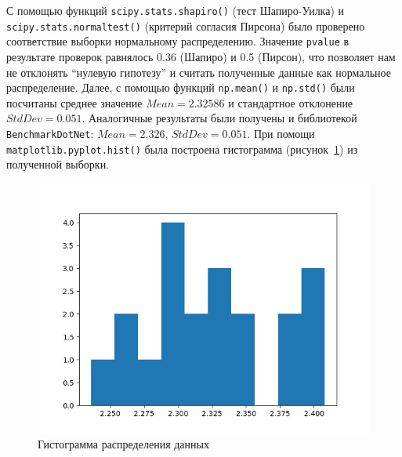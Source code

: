 \begin{table}[h]
\centering
    \caption{Замеры времени работы параллельной версии алгоритма на графе с 5000 вершинами плотности $0.9$. Функция умножения разделена на 16 подзадач, функция сложения на две. Время измерено в секундах.}
    \label{data}
\end{table}

С помощью функций \texttt{scipy.stats.shapiro()} (тест Шапиро-Уилка) и \texttt{scipy.stats.normaltest()} (критерий согласия Пирсона) было проверено соответствие выборки нормальному распределению. Значение \texttt{pvalue} в результате проверок равнялось 0.36 (Шапиро) и 0.5 (Пирсон), что позволяет нам не отклонять \enquote{нулевую гипотезу} и считать полученные данные как нормальное распределение. Далее, с помощью функций \texttt{np.mean()} и \texttt{np.std()} были посчитаны среднее значение $Mean = 2.32586$ и стандартное отклонение $StdDev = 0.051$. Аналогичные результаты были получены и библиотекой \texttt{BenchmarkDotNet}: $Mean = 2.326$, $StdDev = 0.051$. При помощи \texttt{matplotlib.pyplot.hist()} была построена гистограмма (рисунок~\ref{fig:plot}) из полученной выборки.

\begin{figure}[H]
    \centering
    \includegraphics[width=\textwidth]{figures/plot.png}
    \caption{Гистограмма распределения данных}
    \label{fig:plot}
\end{figure}

